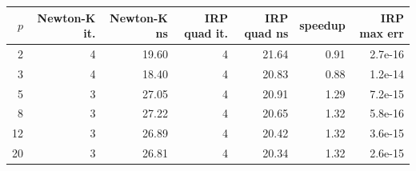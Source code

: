 \begin{tabular}{rrrrrrr}
\toprule
$p$ & Newton-K it. & Newton-K ns & IRP quad it. & IRP quad ns & speedup & IRP max err \\
\midrule
2 & 4 & 19.60 & 4 & 21.64 & 0.91 & 2.7e-16 \\
3 & 4 & 18.40 & 4 & 20.83 & 0.88 & 1.2e-14 \\
5 & 3 & 27.05 & 4 & 20.91 & 1.29 & 7.2e-15 \\
8 & 3 & 27.22 & 4 & 20.65 & 1.32 & 5.8e-16 \\
12 & 3 & 26.89 & 4 & 20.42 & 1.32 & 3.6e-15 \\
20 & 3 & 26.81 & 4 & 20.34 & 1.32 & 2.6e-15 \\
\bottomrule
\end{tabular}
